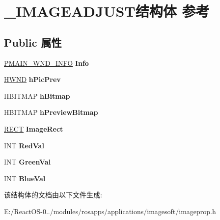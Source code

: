 \hypertarget{struct___i_m_a_g_e_a_d_j_u_s_t}{}\section{\+\_\+\+I\+M\+A\+G\+E\+A\+D\+J\+U\+S\+T结构体 参考}
\label{struct___i_m_a_g_e_a_d_j_u_s_t}
\subsection*{Public 属性}
\begin{DoxyCompactItemize}
\item 
\mbox{\label{struct___i_m_a_g_e_a_d_j_u_s_t_a18a013c3382f3983398dbcc385d84acd}} 
\hyperlink{struct___m_a_i_n___w_n_d___i_n_f_o}{P\+M\+A\+I\+N\+\_\+\+W\+N\+D\+\_\+\+I\+N\+FO} {\bfseries Info}
\item 
\mbox{\label{struct___i_m_a_g_e_a_d_j_u_s_t_acdc9eab17ea256a28713eccb67bb5c28}} 
\hyperlink{interfacevoid}{H\+W\+ND} {\bfseries h\+Pic\+Prev}
\item 
\mbox{\label{struct___i_m_a_g_e_a_d_j_u_s_t_a616b1dad73bc98a15606468c5d9b6781}} 
H\+B\+I\+T\+M\+AP {\bfseries h\+Bitmap}
\item 
\mbox{\label{struct___i_m_a_g_e_a_d_j_u_s_t_a192e6a776ceef5c763afc194347c55e9}} 
H\+B\+I\+T\+M\+AP {\bfseries h\+Preview\+Bitmap}
\item 
\mbox{\label{struct___i_m_a_g_e_a_d_j_u_s_t_a4f653430d03ab655c98115b602039b54}} 
\hyperlink{structtag_r_e_c_t}{R\+E\+CT} {\bfseries Image\+Rect}
\item 
\mbox{\label{struct___i_m_a_g_e_a_d_j_u_s_t_ab5894988ff8c6322ed74992d4714bcb4}} 
I\+NT {\bfseries Red\+Val}
\item 
\mbox{\label{struct___i_m_a_g_e_a_d_j_u_s_t_aca7a6f328da491493e3d570b564f51e2}} 
I\+NT {\bfseries Green\+Val}
\item 
\mbox{\label{struct___i_m_a_g_e_a_d_j_u_s_t_a80dadc9e8096a8f25eee5adeb52187be}} 
I\+NT {\bfseries Blue\+Val}
\end{DoxyCompactItemize}


该结构体的文档由以下文件生成\+:\begin{DoxyCompactItemize}
\item 
E\+:/\+React\+O\+S-\/0../modules/rosapps/applications/imagesoft/imageprop.\+h\end{DoxyCompactItemize}

